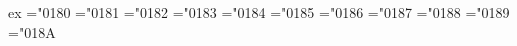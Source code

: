 \def\next{ex}\ifx\next\miprefix
\mathchardef\Gamma="0180
\mathchardef\Delta="0181
\mathchardef\Theta="0182
\mathchardef\Lambda="0183
\mathchardef\Xi="0184
\mathchardef\Pi="0185
\mathchardef\Sigma="0186
\mathchardef\Upsilon="0187
\mathchardef\Phi="0188
\mathchardef\Psi="0189
\mathchardef\Omega="018A
\fi\let\next\undefined

\iftxxenc
\def\aa{\r a}
\def\AA{\r A}
\def\acute{\mathaccent"7001 }
\def\grave{\mathaccent"7000 }
\def\ddot{\mathaccent"7004 }
\def\tilde{\mathaccent"7003 }
\def\bar{\mathaccent"7009 }
\def\breve{\mathaccent"7008 }
\def\check{\mathaccent"7007 }
\def\hat{\mathaccent"7002 }
\def\dot{\mathaccent"700A }
\fi
